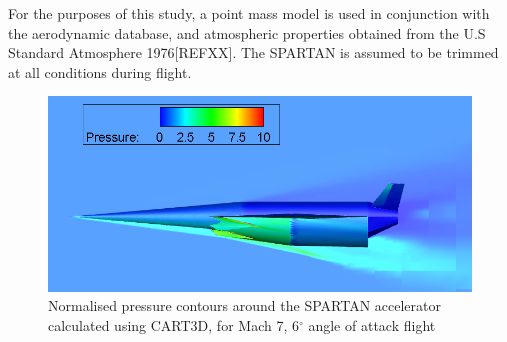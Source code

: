 \documentclass[conf]{new-aiaa}
\begin{document}
 For the purposes of this study, a point mass model is used in conjunction with the aerodynamic database, and atmospheric properties obtained from the U.S Standard Atmosphere 1976[REFXX]. The SPARTAN is assumed to be trimmed at all conditions during flight.
 
 \begin{figure}
 	\centering
 	\includegraphics[width=0.7\linewidth]{Figures/M7AoA6}
 	\caption{Normalised pressure contours around the SPARTAN accelerator calculated using CART3D, for Mach 7, 6$^\circ$ angle of attack flight}
 	\label{fig:M7AoA6}
 \end{figure}
\end{document}
